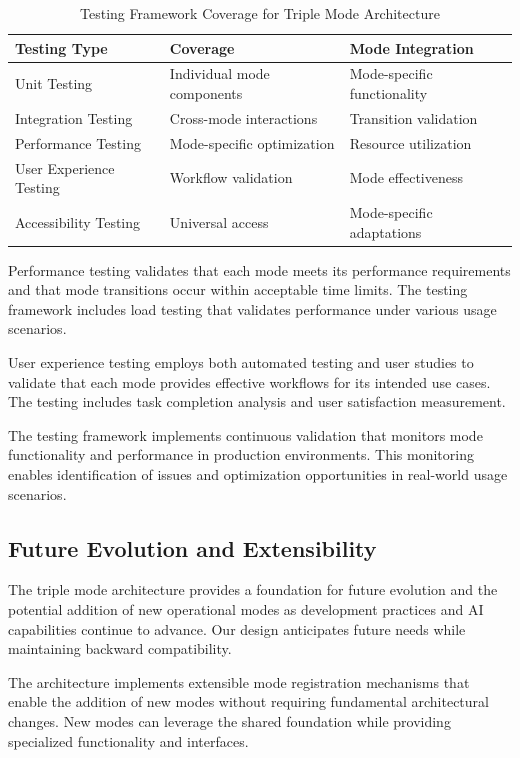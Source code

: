 \begin{table}[ht]
\centering
\begin{tabular}{@{}lll@{}}
\toprule
\textbf{Testing Type} & \textbf{Coverage} & \textbf{Mode Integration} \\
\midrule
Unit Testing & Individual mode components & Mode-specific functionality \\
Integration Testing & Cross-mode interactions & Transition validation \\
Performance Testing & Mode-specific optimization & Resource utilization \\
User Experience Testing & Workflow validation & Mode effectiveness \\
Accessibility Testing & Universal access & Mode-specific adaptations \\
\bottomrule
\end{tabular}
\caption{Testing Framework Coverage for Triple Mode Architecture}
\end{table}

Performance testing validates that each mode meets its performance requirements and that mode transitions occur within acceptable time limits. The testing framework includes load testing that validates performance under various usage scenarios.

User experience testing employs both automated testing and user studies to validate that each mode provides effective workflows for its intended use cases. The testing includes task completion analysis and user satisfaction measurement.

The testing framework implements continuous validation that monitors mode functionality and performance in production environments. This monitoring enables identification of issues and optimization opportunities in real-world usage scenarios.

\subsection*{Future Evolution and Extensibility}

The triple mode architecture provides a foundation for future evolution and the potential addition of new operational modes as development practices and AI capabilities continue to advance. Our design anticipates future needs while maintaining backward compatibility.

The architecture implements extensible mode registration mechanisms that enable the addition of new modes without requiring fundamental architectural changes. New modes can leverage the shared foundation while providing specialized functionality and interfaces.

